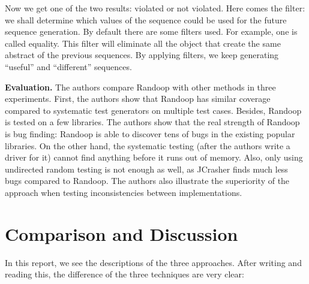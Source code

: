 \documentclass[12pt]{article}
\begin{document}
Now we get one of the two results: violated or not violated. Here comes the filter: we shall determine which values of the sequence could be used for the future sequence generation. By default there are some filters used. For example, one is called equality. This filter will eliminate all the object that create the same abstract of the previous sequences. By applying filters, we keep generating ``useful'' and ``different'' sequences.

\noindent
\textbf{Evaluation.}
The authors compare Randoop with other methods in three experiments. First, the authors show that Randoop has similar coverage compared to systematic test generators on multiple test cases. Besides, Randoop is tested on a few libraries. The authors show that the real strength of Randoop is bug finding: Randoop is able to discover tens of bugs in the existing popular libraries. On the other hand, the systematic testing (after the authors write a driver for it) cannot find anything before it runs out of memory. Also, only using undirected random testing is not enough as well, as JCrasher finds much less bugs compared to Randoop. The authors also illustrate the superiority of the approach when testing inconsistencies between implementations.





\section{Comparison and Discussion}
\label{sec:compare}

In this report, we see the descriptions of the three approaches. After writing and reading this, the difference of the three techniques are very clear:
\end{document}
